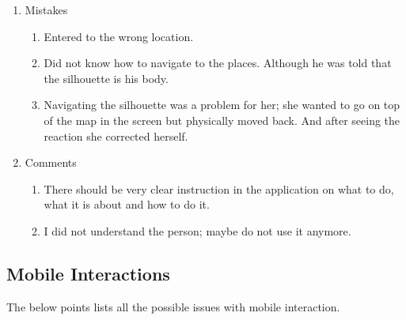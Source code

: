 \begin{enumerate}
\item Mistakes
\begin{enumerate}
\item  Entered to the wrong location.
\item  Did not know how to navigate to the places. Although he was told that the silhouette is his body.
\item  Navigating the silhouette was a problem for her; she wanted to go on top of the map in the screen but physically moved back. And after seeing the reaction she corrected herself.
\end{enumerate}

\item Comments
\begin{enumerate}

\item   There should be very clear instruction in the application on what to do, what it is about and how to do it.
\item   I did not understand the person; maybe do not use it anymore.


\end{enumerate}
\end{enumerate}


\subsection{Mobile Interactions}
The below points lists all the possible issues with mobile interaction.

